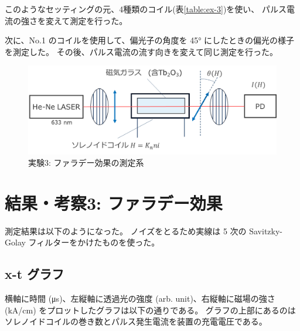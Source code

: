 \documentclass[9pt,dvipdfmx,a4paper]{jsarticle}
\begin{document}
このようなセッティングの元、4種類のコイル(表\ref{table:ex-3})を使い、
パルス電流の強さを変えて測定を行った。

次に、No.1 のコイルを使用して、偏光子の角度を \ang{45} にしたときの偏光の様子を測定した。
その後、パルス電流の流す向きを変えて同じ測定を行った。

\begin{figure}[H]
    \centering
    \includegraphics[width=0.7\columnwidth]{fig_ex-3.png}
    \caption{実験3: ファラデー効果の測定系}
    \label{fig:ex-3}
\end{figure}

\section{結果・考察3: ファラデー効果}
測定結果は以下のようになった。
ノイズをとるため実線は 5 次の Savitzky-Golay フィルターをかけたものを使った。

\subsection*{x-t グラフ}
横軸に時間 (\si{\micro s})、左縦軸に透過光の強度 (arb. unit)、右縦軸に磁場の強さ (kA/cm) をプロットしたグラフは以下の通りである。
グラフの上部にあるのはソレノイドコイルの巻き数とパルス発生電流を装置の充電電圧である。
\end{document}
